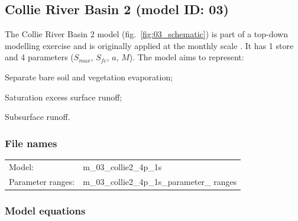 \subsection{Collie River Basin 2 (model ID: 03)}
The Collie River Basin 2 model (fig.~\ref{fig:03_schematic}) is part of a top-down modelling exercise and is originally applied at the monthly scale \citep{Jothityangkoon2001}. It has 1 store and 4 parameters ($S_{max}$, $S_{fc}$, $a$, $M$). The model aims to represent:

\begin{itemizecompact}
\item Separate bare soil and vegetation evaporation;
\item Saturation excess surface runoff;
\item Subsurface runoff.
\end{itemizecompact}

\subsubsection{File names}
\begin{tabular}{@{}ll}
Model: &m\_03\_collie2\_4p\_1s \\
Parameter ranges: &m\_03\_collie2\_4p\_1s\_parameter\_ ranges \\
\end{tabular}

\subsubsection{Model equations}

